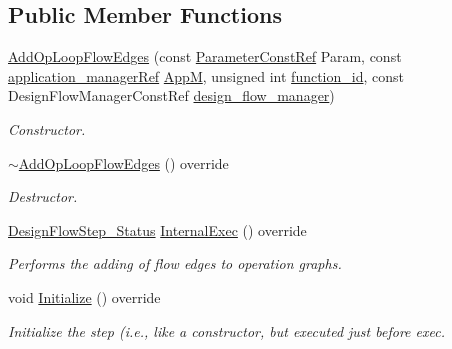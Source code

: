 \subsection*{Public Member Functions}
\begin{DoxyCompactItemize}
\item 
\hyperlink{classAddOpLoopFlowEdges_ae316795e6d1d8d955bf47ffcb7d622fe}{Add\+Op\+Loop\+Flow\+Edges} (const \hyperlink{Parameter_8hpp_a37841774a6fcb479b597fdf8955eb4ea}{Parameter\+Const\+Ref} Param, const \hyperlink{application__manager_8hpp_a04ccad4e5ee401e8934306672082c180}{application\+\_\+manager\+Ref} \hyperlink{classFrontendFlowStep_a0ac0d8db2a378416583f51c4faa59d15}{AppM}, unsigned int \hyperlink{classFunctionFrontendFlowStep_a58ef2383ad1a212a8d3f396625a4b616}{function\+\_\+id}, const Design\+Flow\+Manager\+Const\+Ref \hyperlink{classDesignFlowStep_ab770677ddf087613add30024e16a5554}{design\+\_\+flow\+\_\+manager})
\begin{DoxyCompactList}\small\item\em Constructor. \end{DoxyCompactList}\item 
\hyperlink{classAddOpLoopFlowEdges_a921a77265076b99c802a2b0b0655067b}{$\sim$\+Add\+Op\+Loop\+Flow\+Edges} () override
\begin{DoxyCompactList}\small\item\em Destructor. \end{DoxyCompactList}\item 
\hyperlink{design__flow__step_8hpp_afb1f0d73069c26076b8d31dbc8ebecdf}{Design\+Flow\+Step\+\_\+\+Status} \hyperlink{classAddOpLoopFlowEdges_ac2f9ac00b5800bea8a2167e12f7c9474}{Internal\+Exec} () override
\begin{DoxyCompactList}\small\item\em Performs the adding of flow edges to operation graphs. \end{DoxyCompactList}\item 
void \hyperlink{classAddOpLoopFlowEdges_a6fb9be353ace7d554c91a4056f102855}{Initialize} () override
\begin{DoxyCompactList}\small\item\em Initialize the step (i.\+e., like a constructor, but executed just before exec. \end{DoxyCompactList}\end{DoxyCompactItemize}
